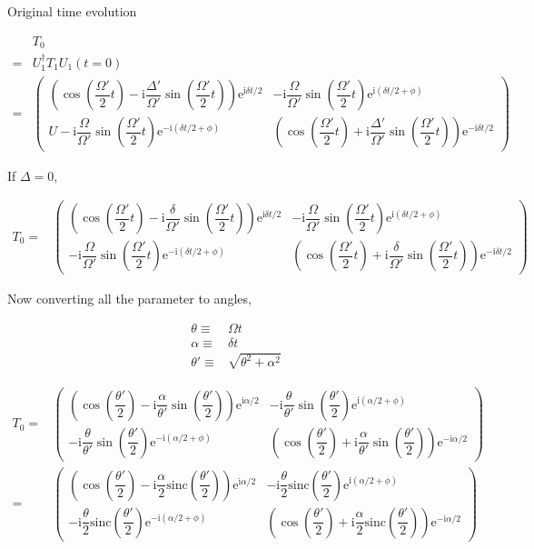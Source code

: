 \documentclass[10pt,fleqn]{article}
\newcommand{\ue}{\mathrm{e}}
\newcommand{\ui}{\mathrm{i}}
\newcommand{\eqar}[1]
{
  \begin{align*}
    #1
  \end{align*}
}
\newcommand{\paren}[1]{{\left({#1}\right)}}
\begin{document}
Original time evolution
\eqar{
  &T_0\\
  =&U_1^\dagger T_1 U_1(t=0)\\
  =&\begin{pmatrix}
    \paren{\cos\paren{\dfrac{\Omega'}{2}t}-\ui\dfrac{\Delta'}{\Omega'}\sin\paren{\dfrac{\Omega'}{2}t}}\ue^{\ui\delta t/2}
    &-\ui\dfrac{\Omega}{\Omega'}\sin\paren{\dfrac{\Omega'}{2}t}\ue^{\ui\paren{\delta t/2 + \phi}}\\
U    -\ui\dfrac{\Omega}{\Omega'}\sin\paren{\dfrac{\Omega'}{2}t}\ue^{-\ui\paren{\delta t/2 + \phi}}
    &\paren{\cos\paren{\dfrac{\Omega'}{2}t}+\ui\dfrac{\Delta'}{\Omega'}\sin\paren{\dfrac{\Omega'}{2}t}}\ue^{-\ui\delta t/2}
  \end{pmatrix}
}

If $\Delta=0$,
\eqar{
  T_0=&\begin{pmatrix}
    \paren{\cos\paren{\dfrac{\Omega'}{2}t}-\ui\dfrac{\delta}{\Omega'}\sin\paren{\dfrac{\Omega'}{2}t}}\ue^{\ui\delta t/2}
    &-\ui\dfrac{\Omega}{\Omega'}\sin\paren{\dfrac{\Omega'}{2}t}\ue^{\ui\paren{\delta t/2 + \phi}}\\
    -\ui\dfrac{\Omega}{\Omega'}\sin\paren{\dfrac{\Omega'}{2}t}\ue^{-\ui\paren{\delta t/2 + \phi}}
    &\paren{\cos\paren{\dfrac{\Omega'}{2}t}+\ui\dfrac{\delta}{\Omega'}\sin\paren{\dfrac{\Omega'}{2}t}}\ue^{-\ui\delta t/2}
  \end{pmatrix}
}
Now converting all the parameter to angles,
\eqar{
  \theta\equiv&\Omega t\\
  \alpha\equiv&\delta t\\
  \theta'\equiv&\sqrt{\theta^2+\alpha^2}
}
\eqar{
  T_0=&\begin{pmatrix}
    \paren{\cos\paren{\dfrac{\theta'}{2}}-\ui\dfrac{\alpha}{\theta'}\sin\paren{\dfrac{\theta'}{2}}}\ue^{\ui\alpha/2}
    &-\ui\dfrac{\theta}{\theta'}\sin\paren{\dfrac{\theta'}{2}}\ue^{\ui\paren{\alpha/2 + \phi}}\\
    -\ui\dfrac{\theta}{\theta'}\sin\paren{\dfrac{\theta'}{2}}\ue^{-\ui\paren{\alpha/2 + \phi}}
    &\paren{\cos\paren{\dfrac{\theta'}{2}}+\ui\dfrac{\alpha}{\theta'}\sin\paren{\dfrac{\theta'}{2}}}\ue^{-\ui\alpha/2}
  \end{pmatrix}\\
  =&\begin{pmatrix}
    \paren{\cos\paren{\dfrac{\theta'}{2}}-\ui\dfrac{\alpha}{2}\mathrm{sinc}\paren{\dfrac{\theta'}{2}}}\ue^{\ui\alpha/2}
    &-\ui\dfrac{\theta}{2}\mathrm{sinc}\paren{\dfrac{\theta'}{2}}\ue^{\ui\paren{\alpha/2 + \phi}}\\
    -\ui\dfrac{\theta}{2}\mathrm{sinc}\paren{\dfrac{\theta'}{2}}\ue^{-\ui\paren{\alpha/2 + \phi}}
    &\paren{\cos\paren{\dfrac{\theta'}{2}}+\ui\dfrac{\alpha}{2}\mathrm{sinc}\paren{\dfrac{\theta'}{2}}}\ue^{-\ui\alpha/2}
  \end{pmatrix}
}
\end{document}
